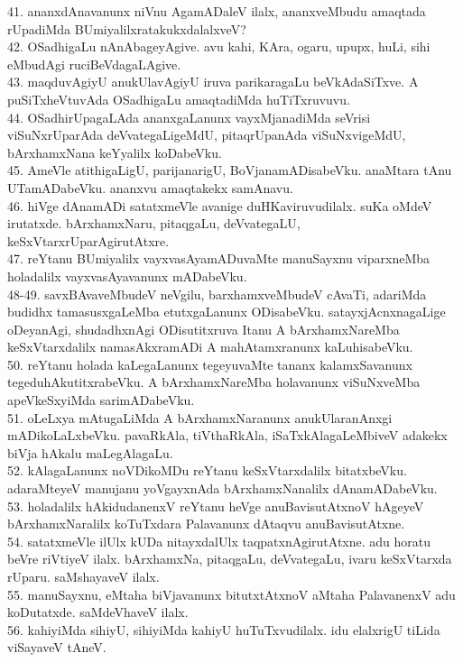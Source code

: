\documentclass{article}
\begin{document}
41. ananxdAnavanunx niVnu AgamADaleV ilalx, ananxveMbudu amaqtada rUpadiMda BUmiyalilxratakukxdalalxveV?\\
42. OSadhigaLu nAnAbageyAgive. avu kahi, KAra, ogaru, upupx, huLi, sihi eMbudAgi ruciBeVdagaLAgive.\\
43. maqduvAgiyU anukUlavAgiyU iruva parikaragaLu beVkAdaSiTxve. A puSiTxheVtuvAda OSadhigaLu amaqtadiMda huTiTxruvuvu.\\
44. OSadhirUpagaLAda ananxgaLanunx vayxMjanadiMda seVrisi viSuNxrUparAda deVvategaLigeMdU, pitaqrUpanAda viSuNxvigeMdU, bArxhamxNana keYyalilx koDabeVku.\\
45. AmeVle atithigaLigU, parijanarigU, BoVjanamADisabeVku. anaMtara tAnu UTamADabeVku. ananxvu amaqtakekx samAnavu.\\
46. hiVge dAnamADi satatxmeVle avanige duHKaviruvudilalx. suKa oMdeV irutatxde. bArxhamxNaru, pitaqgaLu, deVvategaLU, keSxVtarxrUparAgirutAtxre.\\
47. reYtanu BUmiyalilx vayxvasAyamADuvaMte manuSayxnu viparxneMba holadalilx vayxvasAyavanunx mADabeVku.\\
48-49. savxBAvaveMbudeV neVgilu, barxhamxveMbudeV cAvaTi, adariMda budidhx tamasusxgaLeMba etutxgaLanunx ODisabeVku. satayxjAcnxnagaLige oDeyanAgi, shudadhxnAgi ODisutitxruva Itanu A bArxhamxNareMba keSxVtarxdalilx namasAkxramADi A mahAtamxranunx kaLuhisabeVku.\\
50. reYtanu holada kaLegaLanunx tegeyuvaMte tananx kalamxSavanunx tegeduhAkutitxrabeVku. A bArxhamxNareMba holavanunx viSuNxveMba apeVkeSxyiMda sarimADabeVku.\\
51. oLeLxya mAtugaLiMda A bArxhamxNaranunx anukUlaranAnxgi mADikoLaLxbeVku. pavaRkAla, tiVthaRkAla, iSaTxkAlagaLeMbiveV adakekx biVja hAkalu maLegAlagaLu.\\
52. kAlagaLanunx noVDikoMDu reYtanu keSxVtarxdalilx bitatxbeVku. adaraMteyeV manujanu yoVgayxnAda bArxhamxNanalilx dAnamADabeVku.\\
53. holadalilx hAkidudanenxV reYtanu heVge anuBavisutAtxnoV hAgeyeV bArxhamxNaralilx koTuTxdara Palavanunx dAtaqvu anuBavisutAtxne.\\
54. satatxmeVle ilUlx kUDa nitayxdalUlx taqpatxnAgirutAtxne. adu horatu beVre riVtiyeV ilalx. bArxhamxNa, pitaqgaLu, deVvategaLu, ivaru keSxVtarxda rUparu. saMshayaveV ilalx.\\
55. manuSayxnu, eMtaha biVjavanunx bitutxtAtxnoV aMtaha PalavanenxV adu koDutatxde. saMdeVhaveV ilalx.\\
56. kahiyiMda sihiyU, sihiyiMda kahiyU huTuTxvudilalx. idu elalxrigU tiLida viSayaveV tAneV.\\
\end{document}
